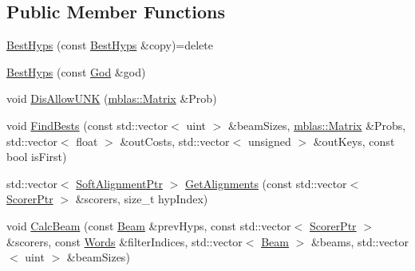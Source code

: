 \subsection*{Public Member Functions}
\begin{DoxyCompactItemize}
\item 
\hyperlink{classamunmt_1_1GPU_1_1BestHyps_a87d08291596f0ae319fb600db3cd4638}{Best\+Hyps} (const \hyperlink{classamunmt_1_1GPU_1_1BestHyps}{Best\+Hyps} \&copy)=delete
\item 
\hyperlink{classamunmt_1_1GPU_1_1BestHyps_a04e8f72a3150817f37d892b2d760e53a}{Best\+Hyps} (const \hyperlink{classamunmt_1_1God}{God} \&god)
\item 
void \hyperlink{classamunmt_1_1GPU_1_1BestHyps_a91cb3ebd6db26f6bc705f4cc360497bf}{Dis\+Allow\+U\+NK} (\hyperlink{namespaceamunmt_1_1GPU_1_1mblas_ab67821a8254de53e45a623cf73c0aef6}{mblas\+::\+Matrix} \&Prob)
\item 
void \hyperlink{classamunmt_1_1GPU_1_1BestHyps_a90f017291d4cd694bd9d55e3392f390c}{Find\+Bests} (const std\+::vector$<$ uint $>$ \&beam\+Sizes, \hyperlink{namespaceamunmt_1_1GPU_1_1mblas_ab67821a8254de53e45a623cf73c0aef6}{mblas\+::\+Matrix} \&Probs, std\+::vector$<$ float $>$ \&out\+Costs, std\+::vector$<$ unsigned $>$ \&out\+Keys, const bool is\+First)
\item 
std\+::vector$<$ \hyperlink{soft__alignment_8h_a875ec1de0fda25e65d972952540246ff}{Soft\+Alignment\+Ptr} $>$ \hyperlink{classamunmt_1_1GPU_1_1BestHyps_a2675e6f24c466b304a16f6d945d68e40}{Get\+Alignments} (const std\+::vector$<$ \hyperlink{namespaceamunmt_a703e88438d533fef1db5cc95060b36f0}{Scorer\+Ptr} $>$ \&scorers, size\+\_\+t hyp\+Index)
\item 
void \hyperlink{classamunmt_1_1GPU_1_1BestHyps_aada8fcf38e61fd1ce649432cb45376d9}{Calc\+Beam} (const \hyperlink{namespaceamunmt_a534a3a9a1d99c01a5adf05e700a26012}{Beam} \&prev\+Hyps, const std\+::vector$<$ \hyperlink{namespaceamunmt_a703e88438d533fef1db5cc95060b36f0}{Scorer\+Ptr} $>$ \&scorers, const \hyperlink{namespaceamunmt_aa50d0b3a5ba58ba5da8a4d88ddab1b18}{Words} \&filter\+Indices, std\+::vector$<$ \hyperlink{namespaceamunmt_a534a3a9a1d99c01a5adf05e700a26012}{Beam} $>$ \&beams, std\+::vector$<$ uint $>$ \&beam\+Sizes)
\end{DoxyCompactItemize}
